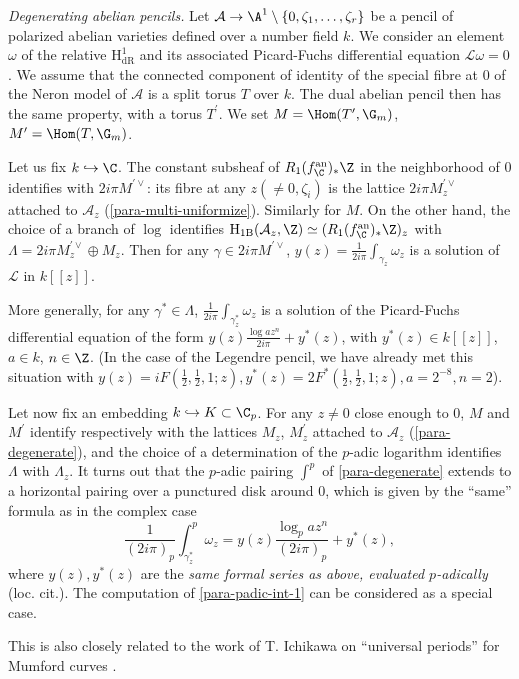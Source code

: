 \begin{para}
 {\itshape Degenerating abelian pencils.}  Let $\mathcal{A}\rightarrow
 {\A}^1\setminus \{0,\zeta_1,\ldots,\zeta_r\}$ be a pencil of polarized
 abelian varieties defined over a number field $k$. We consider an
 element $\omega$ of the relative $\mathrm{H}^1_{\mathrm{dR}}$ and its
 associated Picard-Fuchs differential equation $\mathcal{L}\omega=0$. We
 assume that the connected component of identity of the special fibre at
 $0$ of the Neron model of $\mathcal{A}$ is a split torus $T$ over $k$.
 The dual abelian pencil then has the same property, with a torus
 $T^{\prime}$.  We set $M=\Hom(T',{\G}_m)$, $M'=\Hom(T,{\G}_m)$.

 Let us fix $k\hookrightarrow \C$.  The constant subsheaf of
 $R_1(f^{\mathrm{an}}_{\C})_{\ast}{\Z}$ in the neighborhood of $0$
 identifies with $2i\pi M^{\prime \vee}$: its fibre at any $z (\neq
 0,\zeta_i)$ is the lattice $2i\pi M_z^{\prime \vee}$ attached to
 $\mathcal{A}_z$ (\ref{para-multi-uniformize}).  Similarly for $M$.  On
 the other hand, the choice of a branch of $\log$ identifies
 $\mathrm{H}_{1\mathrm{B}}(\mathcal{A}_z, {\Z})\simeq
 (R_1(f^{\mathrm{an}}_\C)_{\ast}{\Z})_z$ with $\Lambda = 2i\pi
 M_z^{\prime \vee}\oplus M_z$.  Then for any $\gamma \in 2i\pi M^{\prime
 \vee}$, $y(z)= \frac{1}{2i\pi}\int_{\gamma_z}\omega_z$ is a solution of
 $\mathcal{L}$ in $k[[z]]$.

 More generally, for any $\gamma^{\ast} \in \Lambda$, $\frac{1}{2i\pi}
 \int_{\gamma^{\ast}_z} \omega_z $ is a solution of the Picard-Fuchs
 differential equation of the form $y(z) \frac{\log az^n}{2i\pi} +
 y^{\ast}(z)$, with $y^{\ast}(z)\in k[[z]]$, $a\in k$, $n\in \Z$.  (In
 the case of the Legendre pencil, we have already met this situation
 with $y(z)=iF(\frac{1}{2},\frac{1}{2},1;z), y^{\ast}(z)= 2
 F^{\ast}(\frac{1}{2},\frac{1}{2},1;z), a= 2^{-8}, n = 2$).

 Let now fix an embedding $k\hookrightarrow K \subset \C_p$. For any $z
 \neq 0$ close enough to $0$, $M$ and $M^{\prime}$ identify respectively
 with the lattices $M_z$, $M_z^{\prime}$ attached to $\mathcal{A}_z$
 (\ref{para-degenerate}), and the choice of a determination of the
 $p$-adic logarithm identifies $\Lambda$ with $\Lambda_z$. It turns out
 that the $p$-adic pairing $\int^p$ of \ref{para-degenerate} extends to
 a horizontal pairing over a punctured disk around $0$, which is given
 by the ``same'' formula as in the complex case
 \begin{equation*}
 \frac{1}{(2i\pi)_p} \int^p_{\gamma^{\ast}_z}
 \omega_z = y(z)\frac{\log_p az^n}{(2i\pi)_p} + y^{\ast}(z),
 \end{equation*}
 where $y(z), y^{\ast}(z)$ are the \emph{same formal series as above,
 evaluated $p$-adically} (loc. cit.). The computation of
 \ref{para-padic-int-1} can be considered as a special case.

 \noindent This is also closely related to the work of T. Ichikawa on
 ``universal periods'' for Mumford curves
 \cite{sutorsamcoig}.
\end{para}

